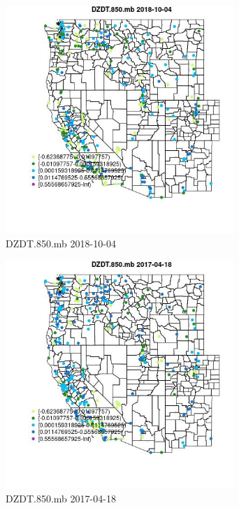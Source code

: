 \begin{figure} 
\centering  
\includegraphics[width=0.77\textwidth]{Code_Outputs/Report_ML_input_PM25_Step4_part_f_de_duplicated_aveswNAs_MapObsDZDT850mb2018-10-04.jpg} 
\caption{\label{fig:Report_ML_input_PM25_Step4_part_f_de_duplicated_aveswNAsMapObsDZDT850mb2018-10-04}DZDT.850.mb 2018-10-04} 
\end{figure} 
 

\begin{figure} 
\centering  
\includegraphics[width=0.77\textwidth]{Code_Outputs/Report_ML_input_PM25_Step4_part_f_de_duplicated_aveswNAs_MapObsDZDT850mb2017-04-18.jpg} 
\caption{\label{fig:Report_ML_input_PM25_Step4_part_f_de_duplicated_aveswNAsMapObsDZDT850mb2017-04-18}DZDT.850.mb 2017-04-18} 
\end{figure} 
 

